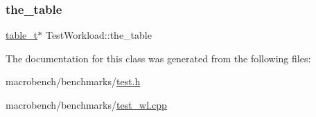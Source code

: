 \subsubsection{\texorpdfstring{the\+\_\+table}{the\_table}}
{\footnotesize\ttfamily \hyperlink{classtable__t}{table\+\_\+t}$\ast$ Test\+Workload\+::the\+\_\+table}



The documentation for this class was generated from the following files\+:\begin{DoxyCompactItemize}
\item 
macrobench/benchmarks/\hyperlink{test_8h}{test.\+h}\item 
macrobench/benchmarks/\hyperlink{test__wl_8cpp}{test\+\_\+wl.\+cpp}\end{DoxyCompactItemize}

